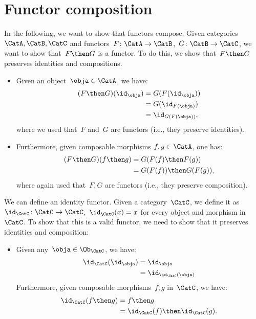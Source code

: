 

\section{Functor composition}


In the following, we want to show that functors compose.
Given categories~$\CatA,\CatB,\CatC$ and functors~$F\colon \CatA\to \CatB$,~$G\colon \CatB\to \CatC$, we want to show that~$F\then G$ is a functor. To do this, we show that~$F\then G$ preserves identities and compositions.
\begin{itemize}
    \item Given an object~$\obja\in \CatA$, we have:
    \begin{equation*}
        \begin{aligned}
        (F\then G)(\id_\obja)
            &=G(F(\id_\obja))\\
            &=G(\id_{F(\obja)})\\
            &=\id_{G(F(\obja))},
        \end{aligned}
    \end{equation*}
    where we used that~$F$ and~$G$ are functors (i.e., they preserve identities).
    \item Furthermore, given composable morphisms $f,g\in \CatA$, one has:
    \begin{equation*}
        \begin{aligned}
        (F\then G)(f\then g)
            &=G(F(f)\then F(g))\\
            &=G(F(f))\then G(F(g)),
        \end{aligned}
    \end{equation*}
    where again used that~$F,G$ are functors (i.e., they preserve composition).
\end{itemize}


We can define an identity functor. Given a category~$\CatC$, we define it as~$\id_\CatC\colon \CatC \to \CatC$,~$\id_\CatC(x)=x$ for every object and morphism in~$\CatC$. To show that this is a valid functor, we need to show that it preserves identities and composition:
\begin{itemize}
    \item Given any~$\obja \in \Ob_\CatC$, we have:
    \begin{equation*}
        \begin{aligned}
            \id_\CatC(\id_\obja)&=\id_\obja\\
            &=\id_{\id_\CatC(\obja)}
        \end{aligned}
    \end{equation*}
    Furthermore, given composable morphisms~$f,g$ in~$\CatC$, we have:
    \begin{equation*}
        \begin{aligned}
            \id_{\CatC}(f\then g)&=f\then g\\
            &=\id_{\CatC}(f)\then \id_{\CatC} (g).
        \end{aligned}
    \end{equation*}
\end{itemize}


